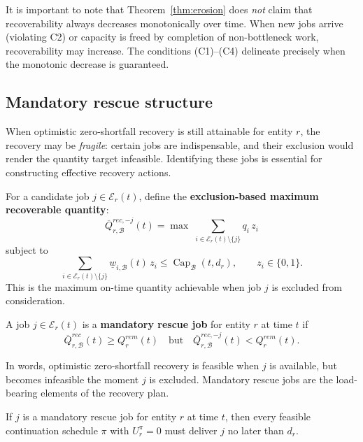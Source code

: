 It is important to note that Theorem~\ref{thm:erosion} does \emph{not} claim that recoverability always decreases monotonically over time. When new jobs arrive (violating C2) or capacity is freed by completion of non-bottleneck work, recoverability may increase. The conditions (C1)--(C4) delineate precisely when the monotonic decrease is guaranteed.

\subsection{Mandatory rescue structure}
\label{sec:mandatory_rescue}

When optimistic zero-shortfall recovery is still attainable for entity $r$, the recovery may be \emph{fragile}: certain jobs are indispensable, and their exclusion would render the quantity target infeasible. Identifying these jobs is essential for constructing effective recovery actions.

For a candidate job $j\in\mathcal E_r(t)$, define the \textbf{exclusion-based maximum recoverable quantity}:
\begin{equation}\label{eq:exclusion_recoverable}
\overline Q_{r,\mathcal B}^{rec,-j}(t)=
\max\;\sum_{i\in\mathcal E_r(t)\setminus\{j\}}q_i\,z_i
\end{equation}
subject to
\begin{equation}
\sum_{i\in\mathcal E_r(t)\setminus\{j\}}\underline w_{i,\mathcal B}(t)\,z_i\le\operatorname{Cap}_{\mathcal B}(t,d_r),\qquad z_i\in\{0,1\}.
\end{equation}
This is the maximum on-time quantity achievable when job $j$ is excluded from consideration.

\begin{definition}\label{def:mandatory}
A job $j\in\mathcal E_r(t)$ is a \textbf{mandatory rescue job} for entity $r$ at time $t$ if
\[
\overline Q_{r,\mathcal B}^{rec}(t)\ge Q_r^{rem}(t)
\quad\text{but}\quad
\overline Q_{r,\mathcal B}^{rec,-j}(t)<Q_r^{rem}(t).
\]
\end{definition}

In words, optimistic zero-shortfall recovery is feasible when $j$ is available, but becomes infeasible the moment $j$ is excluded. Mandatory rescue jobs are the load-bearing elements of the recovery plan.

\begin{theorem}\label{thm:mandatory_delivery}
If $j$ is a mandatory rescue job for entity $r$ at time $t$, then every feasible continuation schedule $\pi$ with $U_r^\pi=0$ must deliver $j$ no later than $d_r$.
\end{theorem}

